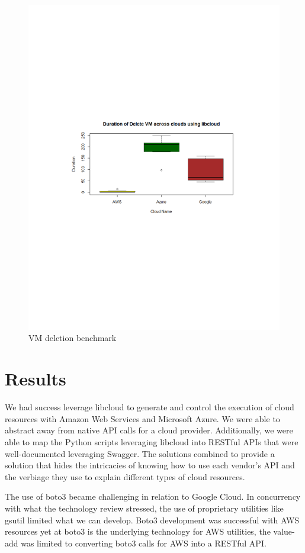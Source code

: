 \begin{figure}[!ht]
  \centering
  \includegraphics[width=\columnwidth]{images/DeleteVM.pdf}
  \caption{VM deletion benchmark}\label{F:vm-delete}
\end{figure}

\section{Results}
We had success leverage libcloud to generate and control the execution of cloud
resources with Amazon Web Services and Microsoft Azure. We were able to
abstract
away from native API calls for a cloud provider. Additionally, we were able to
map the Python scripts leveraging libcloud into RESTful APIs that were
well-documented leveraging Swagger. The solutions combined to provide a
solution
that hides the intricacies of knowing how to use each vendor's API and the
verbiage they use to explain different types of cloud resources.  

The use of boto3 became challenging in relation to Google Cloud. In concurrency
with what the technology review stressed, the use of proprietary utilities like
gsutil limited what we can develop. Boto3 development was successful with AWS
resources yet at boto3 is the underlying technology for AWS utilities, the
value-add was limited to converting boto3 calls for AWS into a RESTful API.

